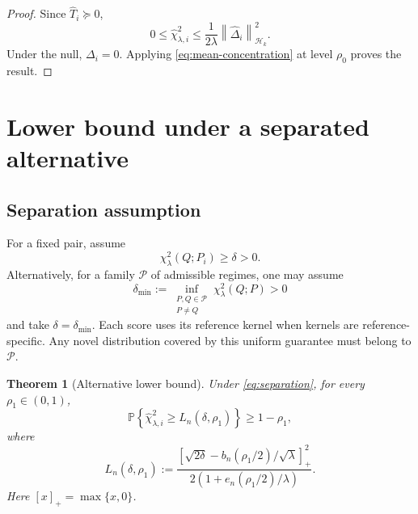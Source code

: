 \documentclass[11pt,a4paper]{article}
\newtheorem{theorem}{Theorem}
\newcommand{\HH}{\mathcal H_k}
\newcommand{\Prob}{\mathbb P}
\newcommand{\norm}[1]{\left\lVert #1\right\rVert}
\begin{document}
\begin{proof}
Since $\widehat T_i\succeq0$,
\[
    0\le\widehat\chi^2_{\lambda,i}
    \le\frac1{2\lambda}
        \norm{\widehat\Delta_i}_{\HH}^2.
\]
Under the null, $\Delta_i=0$.
Applying \eqref{eq:mean-concentration} at level
$\rho_0$ proves the result.
\end{proof}

\section{Lower bound under a separated alternative}

\subsection{Separation assumption}

For a fixed pair, assume
\begin{equation}\label{eq:separation}
    \chi^2_\lambda(Q;P_i)\ge\delta>0.
\end{equation}
Alternatively, for a family $\mathcal P$ of admissible
regimes, one may assume
\[
    \delta_{\min}
    :=
    \inf_{\substack{P,Q\in\mathcal P\\P\ne Q}}
        \chi^2_\lambda(Q;P)>0
\]
and take $\delta=\delta_{\min}$.
Each score uses its reference kernel when kernels
are reference-specific. Any novel distribution
covered by this uniform guarantee must belong
to $\mathcal P$.

\begin{theorem}[Alternative lower bound]
\label{thm:alternative}
Under \eqref{eq:separation}, for every
$\rho_1\in(0,1)$,
\[
    \Prob\left\{
        \widehat\chi^2_{\lambda,i}
        \ge L_n(\delta,\rho_1)
    \right\}
    \ge1-\rho_1,
\]
where
\begin{equation}\label{eq:L}
    \boxed{
    L_n(\delta,\rho_1)
    :=
    \frac{
        \left[
            \sqrt{2\delta}
            -b_n(\rho_1/2)/\sqrt\lambda
        \right]_+^2
    }{
        2\left(1+e_n(\rho_1/2)/\lambda\right)
    }.
    }
\end{equation}
Here $[x]_+=\max\{x,0\}$.
\end{theorem}
\end{document}
